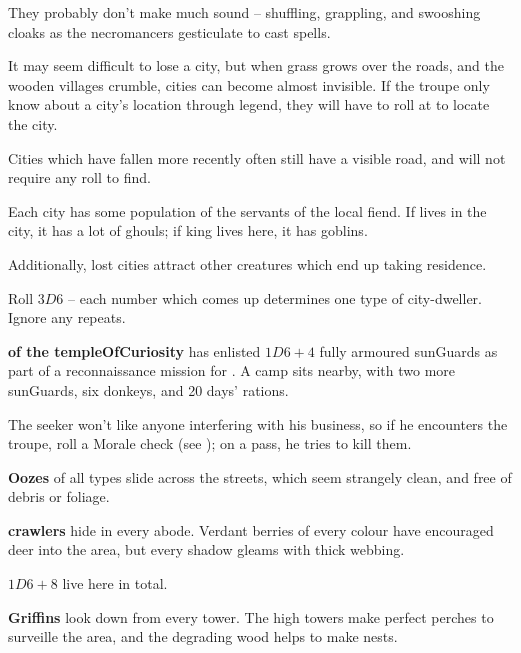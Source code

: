 \begin{multicols}{2}
\begin{exampletext}
  They probably don't make much sound -- shuffling, grappling, and swooshing cloaks as the necromancers gesticulate to cast spells.

\end{exampletext}


It may seem difficult to lose a city, but when grass grows over the roads, and the wooden \glspl{village} crumble, cities can become almost invisible.
If the troupe only know about a city's location through legend, they will have to roll  at \tn[14] to locate the city.

Cities which have fallen more recently often still have a visible road, and will not require any roll to find.

\label{lostDwellers}

Each city has some population of the servants of the local fiend.
If  lives in the city, it has a lot of ghouls; if  king lives here, it has goblins.

Additionally, lost cities attract other creatures which end up taking residence.

Roll $3D6$ -- each number which comes up determines one type of city-dweller.
Ignore any repeats.

\begin{dlist}
  \item
  \textbf{ of the \gls{templeOfCuriosity}} has enlisted $1D6+4$ fully armoured \glspl{sunGuard} as part of a reconnaissance mission for .
  A camp sits nearby, with two more \glspl{sunGuard}, six donkeys, and 20 days' rations.

  The \gls{seeker} won't like anyone interfering with his business, so if he encounters the troupe, roll a Morale check (see ); on a pass, he tries to kill them.
  \item\label{lostOoze}
  \textbf{Oozes} of all types slide across the streets, which seem strangely clean, and free of debris or foliage.
  \item
  \textbf{\glspl{crawler}} hide in every abode.
  Verdant berries of every colour have encouraged deer into the area, but every shadow gleams with thick webbing.

  $1D6+8$ live here in total.
  \item
  \textbf{Griffins} look down from every tower.
  The high towers make perfect perches to surveille the area, and the degrading wood helps to make nests.


\end{dlist}
\end{multicols}
